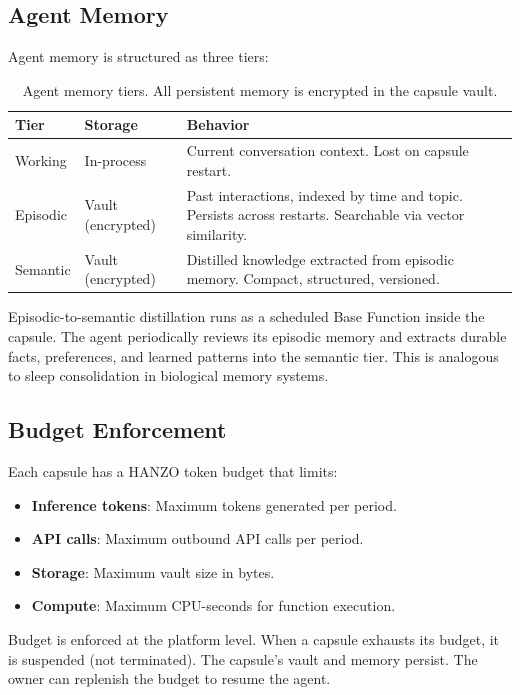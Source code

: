 \subsection{Agent Memory}

Agent memory is structured as three tiers:

\begin{table}[H]
\centering
\small
\begin{tabular}{llp{5cm}}
\toprule
\textbf{Tier} & \textbf{Storage} & \textbf{Behavior} \\
\midrule
Working & In-process & Current conversation context. Lost on capsule
restart. \\
Episodic & Vault (encrypted) & Past interactions, indexed by time and topic.
Persists across restarts. Searchable via vector similarity. \\
Semantic & Vault (encrypted) & Distilled knowledge extracted from episodic
memory. Compact, structured, versioned. \\
\bottomrule
\end{tabular}
\caption{Agent memory tiers. All persistent memory is encrypted in the
capsule vault.}
\label{tab:memory}
\end{table}

Episodic-to-semantic distillation runs as a scheduled Base Function inside the
capsule. The agent periodically reviews its episodic memory and extracts
durable facts, preferences, and learned patterns into the semantic tier. This
is analogous to sleep consolidation in biological memory systems.

\subsection{Budget Enforcement}

Each capsule has a HANZO token budget that limits:

\begin{itemize}[leftmargin=1.1em]
    \item \textbf{Inference tokens}: Maximum tokens generated per period.
    \item \textbf{API calls}: Maximum outbound API calls per period.
    \item \textbf{Storage}: Maximum vault size in bytes.
    \item \textbf{Compute}: Maximum CPU-seconds for function execution.
\end{itemize}

Budget is enforced at the platform level. When a capsule exhausts its budget,
it is suspended (not terminated). The capsule's vault and memory persist.
The owner can replenish the budget to resume the agent.


